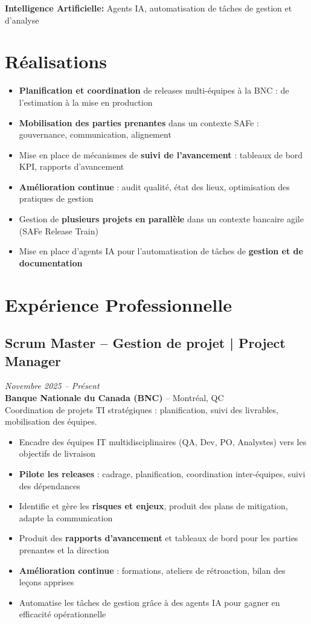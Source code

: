 \documentclass[11pt,a4paper]{article}
\begin{document}
\textbf{Intelligence Artificielle:} Agents IA, automatisation de tâches de gestion et d'analyse

\vspace{6pt}

\section*{Réalisations}
\begin{itemize}
    \item \textbf{Planification et coordination} de releases multi-équipes à la BNC : de l'estimation à la mise en production
    \item \textbf{Mobilisation des parties prenantes} dans un contexte SAFe : gouvernance, communication, alignement
    \item Mise en place de mécanismes de \textbf{suivi de l'avancement} : tableaux de bord KPI, rapports d'avancement
    \item \textbf{Amélioration continue} : audit qualité, état des lieux, optimisation des pratiques de gestion
    \item Gestion de \textbf{plusieurs projets en parallèle} dans un contexte bancaire agile (SAFe Release Train)
    \item Mise en place d'agents IA pour l'automatisation de tâches de \textbf{gestion et de documentation}
\end{itemize}

\section*{Expérience Professionnelle}

\subsection*{Scrum Master -- Gestion de projet | Project Manager} \hfill \textit{Novembre 2025 -- Présent}\\
\textbf{Banque Nationale du Canada (BNC)} -- Montréal, QC\\
Coordination de projets TI stratégiques : planification, suivi des livrables, mobilisation des équipes.
\begin{itemize}
    \item Encadre des équipes IT multidisciplinaires (QA, Dev, PO, Analystes) vers les objectifs de livraison
    \item \textbf{Pilote les releases} : cadrage, planification, coordination inter-équipes, suivi des dépendances
    \item Identifie et gère les \textbf{risques et enjeux}, produit des plans de mitigation, adapte la communication
    \item Produit des \textbf{rapports d'avancement} et tableaux de bord pour les parties prenantes et la direction
    \item \textbf{Amélioration continue} : formations, ateliers de rétroaction, bilan des leçons apprises
    \item Automatise les tâches de gestion grâce à des agents IA pour gagner en efficacité opérationnelle
\end{itemize}
\end{document}
